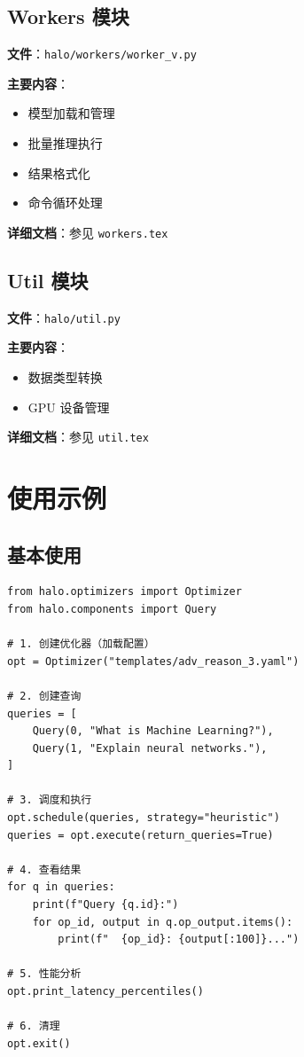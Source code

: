 \documentclass[12pt,a4paper]{article}
\begin{document}
\subsection{Workers 模块}

\textbf{文件}：\texttt{halo/workers/worker\_v.py}

\textbf{主要内容}：
\begin{itemize}
    \item 模型加载和管理
    \item 批量推理执行
    \item 结果格式化
    \item 命令循环处理
\end{itemize}

\textbf{详细文档}：参见 \texttt{workers.tex}

\subsection{Util 模块}

\textbf{文件}：\texttt{halo/util.py}

\textbf{主要内容}：
\begin{itemize}
    \item 数据类型转换
    \item GPU 设备管理
\end{itemize}

\textbf{详细文档}：参见 \texttt{util.tex}

\section{使用示例}

\subsection{基本使用}

\begin{lstlisting}
from halo.optimizers import Optimizer
from halo.components import Query

# 1. 创建优化器（加载配置）
opt = Optimizer("templates/adv_reason_3.yaml")

# 2. 创建查询
queries = [
    Query(0, "What is Machine Learning?"),
    Query(1, "Explain neural networks."),
]

# 3. 调度和执行
opt.schedule(queries, strategy="heuristic")
queries = opt.execute(return_queries=True)

# 4. 查看结果
for q in queries:
    print(f"Query {q.id}:")
    for op_id, output in q.op_output.items():
        print(f"  {op_id}: {output[:100]}...")

# 5. 性能分析
opt.print_latency_percentiles()

# 6. 清理
opt.exit()
\end{lstlisting}
\end{document}
